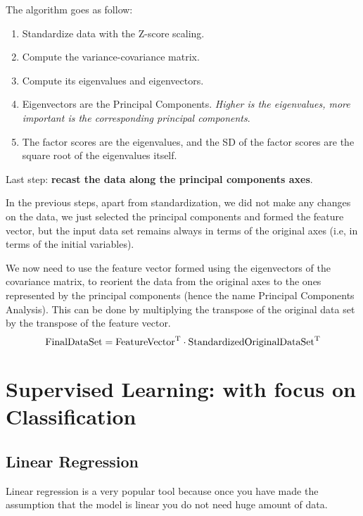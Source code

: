 The algorithm goes as follow:
\begin{enumerate}
    \item Standardize data with the Z-score scaling.
    \item Compute the variance-covariance matrix.
    \item Compute its eigenvalues and eigenvectors.
    \item Eigenvectors are the Principal Components. \textit{Higher is the eigenvalues, more important is the corresponding principal components}.
    \item The factor scores are the eigenvalues, and the SD of the factor scores are the square root of the eigenvalues itself.
\end{enumerate}

Last step: \textbf{recast the data along the principal components axes}.

In the previous steps, apart from standardization, we did not make any changes on the data, we just selected the principal components and formed the feature vector, but the input data set remains always in terms of the original axes (i.e, in terms of the initial variables).

We now need to use the feature vector formed using the eigenvectors of the covariance matrix, to reorient the data from the original axes to the ones represented by the principal components (hence the name Principal Components Analysis). This can be done by multiplying the transpose of the original data set by the transpose of the feature vector.
\begin{equation*}
    \text{FinalDataSet} =\text{FeatureVector}^{\mathrm{T}} \cdot \text{StandardizedOriginalDataSet}^{\mathrm{T}}
\end{equation*}

\section{Supervised Learning: with focus on Classification}

\subsection{Linear Regression}

Linear regression is a very popular tool because once you have made the assumption that the model is linear you do not need huge amount of data.

